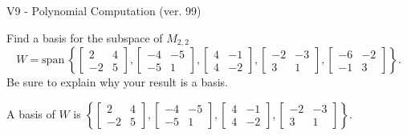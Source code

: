 \begin{exercise}
  \begin{exerciseTitle}V9 - Polynomial Computation (ver. 99)\end{exerciseTitle}
  \begin{exerciseStatement}
    Find a basis for the subspace of \(M_{2,2}\) 
\[W=\mathrm{span}\ \left\{\left[\begin{array}{cc}
2 & 4 \\
-2 & 5
\end{array}\right] , \left[\begin{array}{cc}
-4 & -5 \\
-5 & 1
\end{array}\right] , \left[\begin{array}{cc}
4 & -1 \\
4 & -2
\end{array}\right] , \left[\begin{array}{cc}
-2 & -3 \\
3 & 1
\end{array}\right] , \left[\begin{array}{cc}
-6 & -2 \\
-1 & 3
\end{array}\right]\right\}.\]
 Be sure to explain why your result is a basis.


  \end{exerciseStatement}
  \begin{exerciseAnswer}
   A basis of \(W\) is  \(\left\{\left[\begin{array}{cc}
2 & 4 \\
-2 & 5
\end{array}\right] , \left[\begin{array}{cc}
-4 & -5 \\
-5 & 1
\end{array}\right] , \left[\begin{array}{cc}
4 & -1 \\
4 & -2
\end{array}\right] , \left[\begin{array}{cc}
-2 & -3 \\
3 & 1
\end{array}\right]\right\}\).
  


  \end{exerciseAnswer}
\end{exercise}